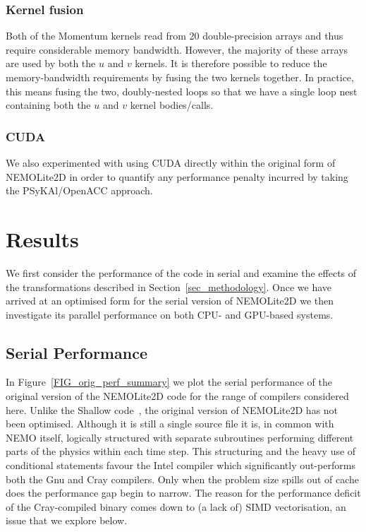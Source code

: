 \documentclass[gmd, manuscript]{copernicus}
\begin{document}
\subsubsection{Kernel fusion}

Both of the Momentum kernels read from 20 double-precision arrays and
thus require considerable memory bandwidth.  However, the majority of
these arrays are used by both the $u$ and $v$ kernels. It is therefore
possible to reduce the memory-bandwidth requirements by fusing the two
kernels together. In practice, this means fusing the two,
doubly-nested loops so that we have a single loop nest containing both
the $u$ and $v$ kernel bodies/calls.

\subsubsection{CUDA}

We also experimented with using CUDA directly within the original form
of NEMOLite2D in order to quantify any performance penalty incurred by
taking the {PS}y{KA}l/OpenACC approach.

\section{Results}

We first consider the performance of the code in serial and examine
the effects of the transformations described in
Section~\ref{sec_methodology}. Once we have arrived at an optimised
form for the serial version of NEMOLite2D we then investigate its
parallel performance on both CPU- and GPU-based systems.

\subsection{Serial Performance}

In Figure~\ref{FIG_orig_perf_summary} we plot the serial performance
of the original version of the NEMOLite2D code for the range of
compilers considered here. Unlike the Shallow
code~\citep{shallow_psykal}, the original version of NEMOLite2D has not
been optimised. Although it is still a single source file it is, in
common with NEMO itself, logically structured with separate
subroutines performing different parts of the physics within each time
step. This structuring and the heavy use of conditional statements
favour the Intel compiler which significantly out-performs both the
Gnu and Cray compilers. Only when the problem size spills out of cache
does the performance gap begin to narrow. The reason for the
performance deficit of the Cray-compiled binary comes down to (a lack
of) SIMD vectorisation, an issue that we explore below.
\end{document}
